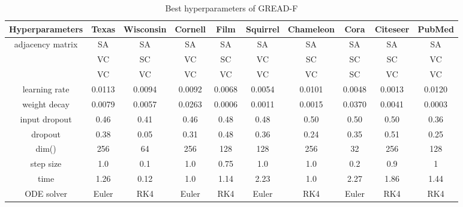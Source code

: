 \documentclass{article}
\theoremstyle{plain}
\theoremstyle{definition}
\theoremstyle{remark}
\begin{document}
\begin{table*}[ht!]
    \centering
    \small
    \caption{Best hyperparameters of GREAD-F}
    \label{tab:best_F}
    \begin{tabular}{c ccccccccc} \toprule
        Hyperparameters  & Texas  & Wisconsin 
                                           & Cornell& Film   & Squirrel 
                                                                      & Chameleon
                                                                               & Cora   & Citeseer 
                                                                                                 & PubMed\\ \midrule
        adjacency matrix & SA     & SA     & SA     & SA     & SA     & SA     & SA     & SA     & SA    \\
                 & VC     & SC     & VC     & SC     & VC     & SC     & SC     & SC     & VC    \\
                  & VC     & VC     & VC     & VC     & VC     & VC     & SC     & VC     & VC    \\
        learning rate    & 0.0113 & 0.0094 & 0.0092 & 0.0068 & 0.0054 & 0.0101 & 0.0048 & 0.0013 & 0.0120\\
        weight decay     & 0.0079 & 0.0057 & 0.0263 & 0.0006 & 0.0011 & 0.0015 & 0.0370 & 0.0041 & 0.0003\\
        input dropout    & 0.46   & 0.41   & 0.46   & 0.48   & 0.48   & 0.50   & 0.50   & 0.50   & 0.36\\
        dropout          & 0.38   & 0.05   & 0.31   & 0.48   & 0.36   & 0.24   & 0.35   & 0.51   & 0.25\\
        dim()& 256    & 64     & 256    & 128    & 128    & 256    & 32     & 256    & 128\\
        step size  & 1.0    & 0.1    & 1.0    & 0.75   & 1.0    & 1.0    & 0.2    & 0.9    & 1\\
        time          & 1.26   & 0.12   & 1.0    & 1.14   & 2.23   & 1.0    & 2.27   & 1.86   & 1.44\\
        ODE solver       & Euler  & RK4  & Euler  & RK4    & Euler  & RK4    & Euler    & RK4    & RK4  \\
        \bottomrule
    \end{tabular}
\end{table*}
\end{document}
